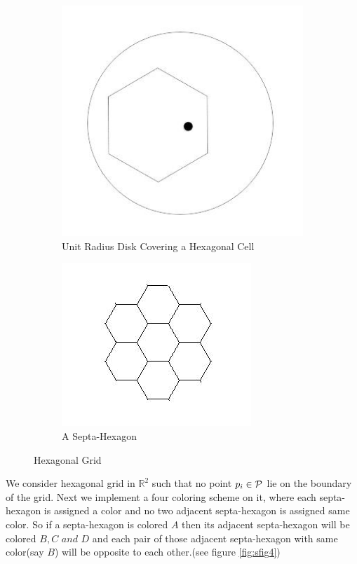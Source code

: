 \documentclass[a4paper,10pt]{article}  %
\begin{document}
	\begin{figure}
		\begin{subfigure}{.5\textwidth}
			\centering
			\includegraphics[width=.8\linewidth]{hexa1.png}
			\caption{Unit Radius Disk Covering a Hexagonal Cell}
			\label{fig:sfig1}
		\end{subfigure}%
		\begin{subfigure}{.5\textwidth}
			\centering
			\includegraphics[width=.8\linewidth]{hexa2.png}
			\caption{A Septa-Hexagon}
			\label{fig:sfig2}
		\end{subfigure}
		\caption{Hexagonal Grid}
		\label{fig:fig1}
	\end{figure}
	
	We consider hexagonal grid in $\mathbb{R}^2$ such that no point $p_i \in {\cal P}$ lie on the boundary of the grid. Next we implement a four coloring scheme on it, where each septa-hexagon is assigned a color and no two adjacent septa-hexagon is assigned same color. So if a septa-hexagon is colored $A$ then its adjacent septa-hexagon will be colored $B,C$ $and$ $D$ and each pair of those adjacent septa-hexagon with same color(say $B$) will be opposite to each other.(see figure  \ref{fig:sfig4})
	
\end{document}
